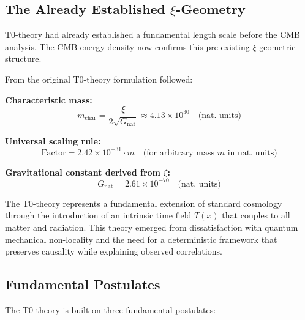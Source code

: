 \documentclass[12pt,a4paper]{article}
\newcommand{\Tfield}{T(x)}
\theoremstyle{definition}
\theoremstyle{remark}
\begin{document}
	\subsection{The Already Established $\xi$-Geometry}
	
	\begin{important}
		T0-theory had already established a fundamental length scale before the CMB analysis. The CMB energy density now confirms this pre-existing $\xi$-geometric structure.
	\end{important}
	
	From the original T0-theory formulation followed:
	
	\textbf{Characteristic mass:}
	\begin{equation}
		m_{\text{char}} = \frac{\xi}{2\sqrt{G_{\text{nat}}}} \approx 4.13 \times 10^{30} \quad \text{(nat. units)}
	\end{equation}
	
	\textbf{Universal scaling rule:}
	\begin{equation}
		\text{Factor} = 2.42 \times 10^{-31} \cdot m \quad \text{(for arbitrary mass } m \text{ in nat. units)}
	\end{equation}
	
	\textbf{Gravitational constant derived from $\xi$:}
	\begin{equation}
		G_{\text{nat}} = 2.61 \times 10^{-70} \quad \text{(nat. units)}
	\end{equation}
	\label{sec:t0_framework}
	
	The T0-theory represents a fundamental extension of standard cosmology through the introduction of an intrinsic time field $\Tfield$ that couples to all matter and radiation. This theory emerged from dissatisfaction with quantum mechanical non-locality and the need for a deterministic framework that preserves causality while explaining observed correlations.
	
	\subsection{Fundamental Postulates}
	
	The T0-theory is built on three fundamental postulates:
	
\end{document}
